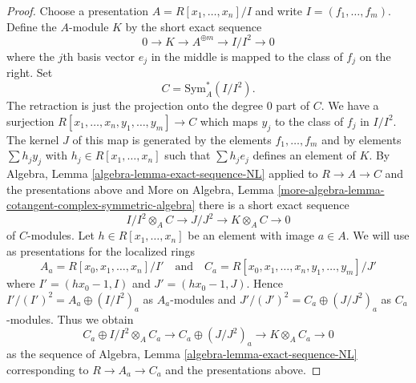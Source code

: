 \begin{proof}
Choose a presentation $A = R[x_1, \ldots, x_n]/I$ and write
$I = (f_1, \ldots, f_m)$. Define the $A$-module $K$ by the short exact sequence
$$
0 \to K \to A^{\oplus m} \to I/I^2 \to 0
$$
where the $j$th basis vector $e_j$ in the middle is mapped to the class of
$f_j$ on the right. Set
$$
C = \text{Sym}^*_A(I/I^2).
$$
The retraction is just the projection onto the degree $0$ part of $C$.
We have a surjection $R[x_1, \ldots, x_n, y_1, \ldots, y_m] \to C$
which maps $y_j$ to the class of $f_j$ in $I/I^2$. The kernel $J$ of this
map is generated by the elements $f_1, \ldots, f_m$ and by elements
$\sum h_j y_j$ with $h_j \in R[x_1, \ldots, x_n]$ such that
$\sum h_j e_j$ defines an element of $K$. By
Algebra, Lemma \ref{algebra-lemma-exact-sequence-NL}
applied to $R \to A \to C$ and the presentations above and
More on Algebra, Lemma
\ref{more-algebra-lemma-cotangent-complex-symmetric-algebra}
there is a short exact sequence
\begin{equation}
\label{equation-sequence}
I/I^2 \otimes_A C \to J/J^2 \to K \otimes_A C \to 0
\end{equation}
of $C$-modules. Let $h \in R[x_1, \ldots, x_n]$ be an element
with image $a \in A$. We will use as presentations for the localized rings
$$
A_a = R[x_0, x_1, \ldots, x_n]/I'
\quad\text{and}\quad
C_a = R[x_0, x_1, \ldots, x_n, y_1, \ldots, y_m]/J'
$$
where $I' = (hx_0 - 1, I)$ and $J' = (hx_0 - 1, J)$. Hence
$I'/(I')^2 = A_a \oplus (I/I^2)_a$ as $A_a$-modules and
$J'/(J')^2 = C_a \oplus (J/J^2)_a$ as $C_a$-modules.
Thus we obtain
\begin{equation}
\label{equation-sequence-localized}
C_a \oplus I/I^2 \otimes_A C_a \to
C_a \oplus (J/J^2)_a \to
K \otimes_A C_a \to 0
\end{equation}
as the sequence of
Algebra, Lemma \ref{algebra-lemma-exact-sequence-NL}
corresponding to $R \to A_a \to C_a$ and the presentations above.


\end{proof}
